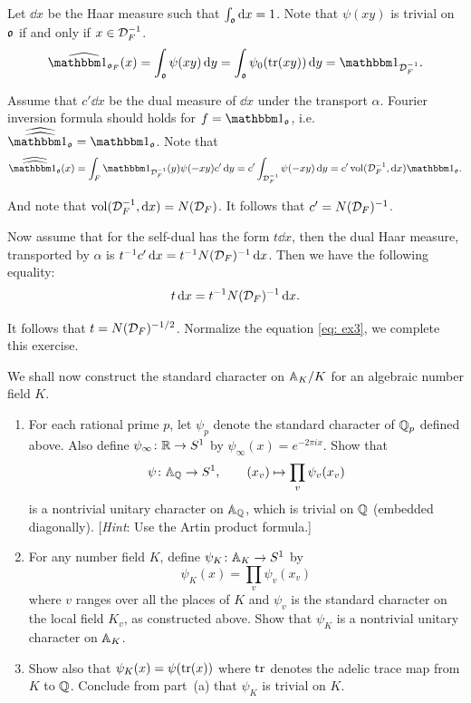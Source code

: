 \begin{solution}
Let $\dd x$ be the Haar measure such that $\int_{\mathfrak{o}} \mathop{}\!\mathrm{d} x = 1$.
Note that $\psi(x y)$ is trivial on $\mathfrak{o}$ if and only if $x \in \mathcal{D}_F^{-1}$.
\begin{equation}
  \dual{\bbone_{\gotho_F}} (x) = \int_{\gotho} \psi(x y) \dd y
= \int_{\gotho} \psi_0(\tr(xy)) \dd y = \bbone_{\calD_F^{-1}}. \label{eq: ex3}
\end{equation}

Assume that $c' \dd x$ be the dual measure of $\dd x$ under the transport $\alpha$.
Fourier inversion formula should holds for $f = \bbone_{\gotho}$, i.e.
$\dual{\dual{\bbone_{\gotho}}} = \bbone_{\gotho}$.
Note that
\[\dual{\dual{\bbone_{\gotho}}}(x) = \int_{F} \bbone_{\calD_F^{-1}}(y) \psi(-xy) c' \dd y =
c' \int_{\calD_{F} ^ {-1}} \psi(-xy) \dd y = c' \vol(\calD_F^{-1}, \dd x) \bbone_{\gotho}.  \]

And note that $\operatorname{vol} (\mathcal{D}_F^{-1}, \mathop{}\!\mathrm{d} x) = N(\mathcal{D}_F)$. It follows that $c' = N(\mathcal{D}_F)^{-1}$.

Now assume that for the self-dual has the form $t \dd x$, then the dual Haar measure,
transported by $\alpha$ is $t^{-1} c' \mathop{}\!\mathrm{d} x = t^{-1} N(\mathcal{D}_F) ^{-1} \mathop{}\!\mathrm{d} x$. Then we have the
following equality:
\[t \mathop{}\!\mathrm{d} x = t^{-1} N(\mathcal{D}_F)^{-1} \mathop{}\!\mathrm{d} x.\]

It follows that $t = N(\mathcal{D}_F) ^{-1/2}$. Normalize the equation \eqref{eq: ex3},
we complete this exercise.
\end{solution}

\begin{exercise}[4]
  \label{ex:ch7-4}
  We shall now construct the standard character on $\mathbb{A}_K/K$ for an
  algebraic number field $K$.
  \begin{enumerate}[label=(\alph*)]
    \item For each rational prime $p$, let $\psi_p$ denote the standard
      character of $\mathbb{Q}_p$ defined above. Also define
      $\psi_\infty \colon \mathbb{R} \to S^1$ by $\psi_\infty(x) = e^{-2\pi i x}$.
      Show that
      \[
        \psi \colon \mathbb{A}_{\mathbb{Q}} \to S^1, \qquad
        (x_v) \mapsto \prod_v \psi_v(x_v)
      \]
      is a nontrivial unitary character on $\mathbb{A}_{\mathbb{Q}}$, which is trivial on
      $\mathbb{Q}$ (embedded diagonally). [\emph{Hint}: Use the Artin product
      formula.]
    \item For any number field $K$, define $\psi_K \colon \mathbb{A}_K \to S^1$ by
      \[
        \psi_K(x) = \prod_v \psi_v(x_v)
      \]
      where $v$ ranges over all the places of $K$ and $\psi_v$ is the standard
      character on the local field $K_v$, as constructed above. Show that
      $\psi_K$ is a nontrivial unitary character on $\mathbb{A}_K$.
    \item Show also that $\psi_K(x) = \psi(\operatorname{tr}(x))$ where $\operatorname{tr}$ denotes the
      adelic trace map from $K$ to $\mathbb{Q}$. Conclude from part~(a) that
      $\psi_K$ is trivial on $K$.
  \end{enumerate}
\end{exercise}

